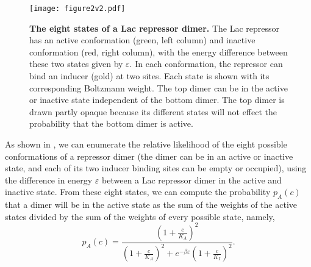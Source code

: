 \begin{figure}[h]
	\centering \texttt{[image: figure2v2.pdf]}
	\caption{{\bf The eight states of a Lac repressor dimer.}  The Lac repressor has
		an active conformation (green, left column) and inactive conformation (red,
		right column), with the energy difference between these two states given by
		$\varepsilon$. In each conformation, the repressor can bind an inducer (gold) at
		two sites. Each state is shown with its corresponding Boltzmann weight. The top
		dimer can be in the active or inactive state independent of the bottom dimer.
		The top dimer is drawn partly opaque because its different states will not
		effect the probability that the bottom dimer is active. %
	} \label{figrepressorInducerStates}
\end{figure}

As shown in \fref[figrepressorInducerStates], we can enumerate the relative
likelihood of the eight possible conformations of a repressor dimer (the dimer
can be in an active or inactive state, and each of its two inducer binding sites
can be empty or occupied), using the difference in energy $\varepsilon$  between a
Lac repressor dimer in the active and inactive state. From these eight states, we can
compute the probability \(p_A(c)\) that a dimer will be in the active state
as the sum of the weights of the active states divided by the sum of the weights
of every possible state, namely,
\begin{equation}\label{eq6}
p_A(c)=\frac{\left(1+\frac{c}{K_A}\right)^2}{\left(1+\frac{c}{K_A}\right)^2+e^{-\beta  \varepsilon }\left(1+\frac{c}{K_I}\right)^2}.
\end{equation}


